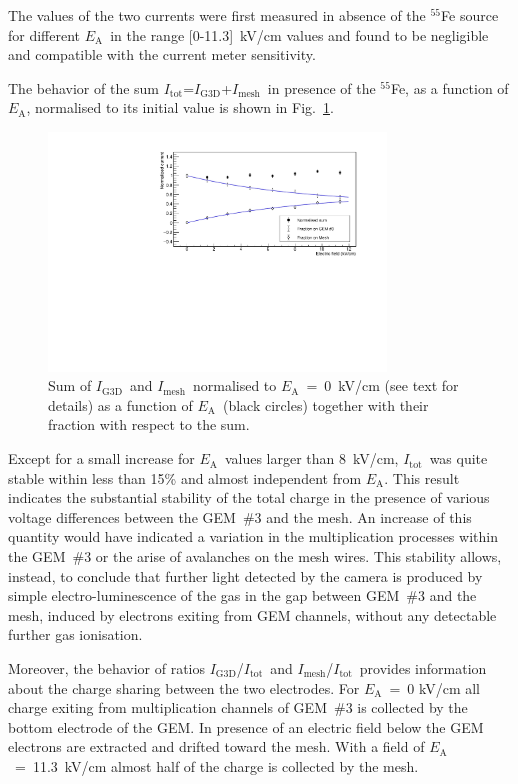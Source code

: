 \documentclass[a4paper,11pt]{article}
\newcommand{\Itot}{$I_{\mathrm{tot}}$}
\newcommand{\Ig}  {$I_{\mathrm{G3D}}$}
\newcommand{\Ime}  {$I_{\mathrm{mesh}}$}
\newcommand{\Ea}  {$E_{\mathrm{A}}$}
\begin{document}
The values of the two currents were first measured in absence of the $^{55}$Fe source for different \Ea\ in the range [0-11.3]~kV/cm values and found to be negligible and compatible with the current meter sensitivity.

The behavior of the sum \Itot=\Ig +\Ime\ in presence of the $^{55}$Fe, as a function of 
\Ea, normalised to its initial value is shown in Fig.~\ref{fig:currents}.

\begin{figure}[ht]
\centering
\includegraphics[width=0.80\textwidth]{currents.pdf}
\caption{Sum of \Ig\ and \Ime\ normalised to \Ea~=~0~kV/cm (see text for details) as a function of \Ea\  (black circles) together with their 
fraction with respect to the sum.} 
\label{fig:currents}
\end{figure}

Except for a small increase for \Ea\ values larger than 8~kV/cm, \Itot\ was quite stable within less than 15\% and almost independent from \Ea. This result indicates the substantial stability of the total charge in the presence of various voltage differences between the GEM~\#3 and the mesh. An increase of this quantity would have indicated a variation in the multiplication processes within the GEM~\#3 or the arise of avalanches on the mesh wires.
This stability allows, instead, to conclude that further light detected by the camera is produced by simple electro-luminescence of the gas in the gap between GEM~\#3 and the mesh, induced by electrons exiting from GEM channels, without any detectable further gas ionisation.

Moreover, the behavior of ratios  \Ig/\Itot\ and \Ime/\Itot\ provides information about the charge sharing between the two electrodes.
For \Ea~=~0 kV/cm all charge exiting from multiplication channels of GEM~\#3 is collected by the bottom electrode of the GEM. In presence of an electric field below the GEM electrons are extracted and drifted toward the mesh. With a field of \Ea~=~11.3~kV/cm almost half of the charge is collected by the mesh.
\end{document}
